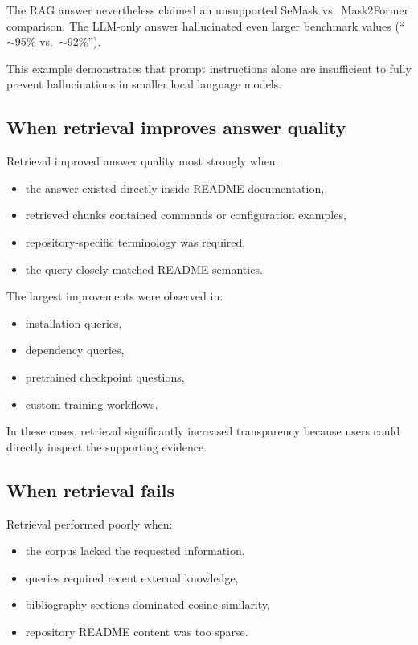 \documentclass[11pt,a4paper]{article}
\begin{document}
The RAG answer nevertheless claimed an unsupported SeMask vs.\ Mask2Former comparison. The LLM-only answer hallucinated even larger benchmark values (``\(\sim\)95\% vs.\ \(\sim\)92\%'').

This example demonstrates that prompt instructions alone are insufficient to fully prevent hallucinations in smaller local language models.

\subsection{When retrieval improves answer quality}
Retrieval improved answer quality most strongly when:

\begin{itemize}
  \item the answer existed directly inside README documentation,
  \item retrieved chunks contained commands or configuration examples,
  \item repository-specific terminology was required,
  \item the query closely matched README semantics.
\end{itemize}

The largest improvements were observed in:

\begin{itemize}
  \item installation queries,
  \item dependency queries,
  \item pretrained checkpoint questions,
  \item custom training workflows.
\end{itemize}

In these cases, retrieval significantly increased transparency because users could directly inspect the supporting evidence.

\subsection{When retrieval fails}
Retrieval performed poorly when:

\begin{itemize}
  \item the corpus lacked the requested information,
  \item queries required recent external knowledge,
  \item bibliography sections dominated cosine similarity,
  \item repository README content was too sparse.
\end{itemize}
\end{document}
